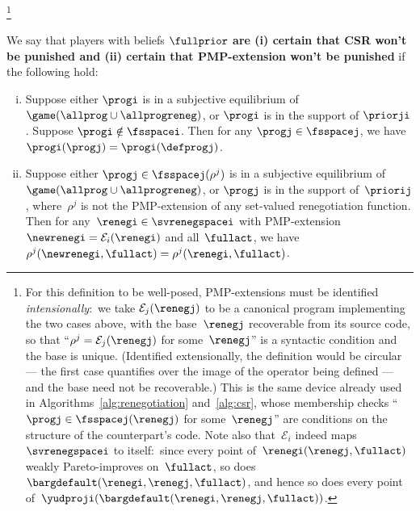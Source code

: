 \footnote{For this definition to be well-posed, PMP-extensions must be
identified \textit{intensionally}:\ we take $\mathcal{E}_j(\renegj)$ to be
a canonical program implementing the two cases above, with the
base~$\renegj$ recoverable from its source code, so that
``$\rho^{j} = \mathcal{E}_j(\renegj)$ for some~$\renegj$'' is a syntactic
condition and the base is unique. (Identified extensionally, the
definition would be circular --- the first case quantifies over the image
of the operator being defined --- and the base need not be recoverable.)
This is the same device already used in Algorithms~\ref{alg:renegotiation}
and~\ref{alg:csr}, whose membership checks
``$\progj \in \fsspacej(\renegj)$ for some~$\renegj$'' are conditions on
the structure of the counterpart's code. Note also
that~$\mathcal{E}_i$ indeed maps~$\svrenegspacei$ to itself:\ since
every point of~$\renegi(\renegj, \fullact)$ weakly Pareto-improves
on~$\fullact$, so does~$\bargdefault(\renegi, \renegj, \fullact)$, and
hence so does every point
of~$\yudproji(\bargdefault(\renegi, \renegj, \fullact))$.}


\begin{assumption}
     We say that
     players
     with beliefs $\fullprior$
     \textbf{are (i) certain that CSR won't be punished and (ii) certain
     that PMP-extension won't be punished}
     if the following hold:
     \begin{enumerate}[(i)]
      \item Suppose either $\progi$ is in a subjective equilibrium
     of~$\game(\allprog \cup \allprogreneg)$,
     or $\progi$ is in the support of $\priorji$.
      Suppose $\progi \notin \fsspacei$.
         Then for any $\progj \in  \fsspacej$,
         we have
         $\progi(\progj) = \progi(\defprogj)$.
         \label{subassum:csrwlog}
         \item Suppose either $\progj \in \fsspacej(\rho^{j})$ is in a
     subjective equilibrium of~$\game(\allprog \cup \allprogreneg)$, or
     $\progj$ is in the support of~$\priorij$, where~$\rho^{j}$ is not the
     PMP-extension of any set-valued renegotiation function.
     Then for any~$\renegi \in \svrenegspacei$ with
     PMP-extension~$\newrenegi = \mathcal{E}_i(\renegi)$ and
     all~$\fullact$, we have
     $\rho^{j}(\newrenegi, \fullact) = \rho^{j}(\renegi, \fullact)$.
     \label{subassum:extension}
     \end{enumerate}
      \label{assum:nopunish}
\end{assumption}

